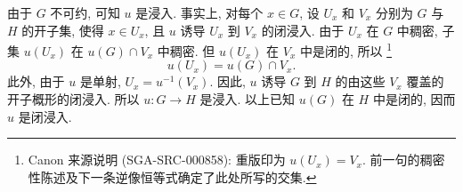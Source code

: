 由于 \(G\) 不可约, 可知 \(u\) 是浸入.
事实上, 对每个 \(x\in G\),
设 \(U_x\) 和 \(V_x\) 分别为 \(G\) 与 \(H\) 的开子集,
使得 \(x\in U_x\), 且 \(u\) 诱导 \(U_x\) 到 \(V_x\) 的闭浸入.
由于 \(U_x\) 在 \(G\) 中稠密,
子集 \(u(U_x)\) 在 \(u(G)\cap V_x\) 中稠密.
但 \(u(U_x)\) 在 \(V_x\) 中是闭的, 所以
\footnote{Canon 来源说明 (SGA-SRC-000858): 重版印为 \(u(U_x)=V_x\).
前一句的稠密性陈述及下一条逆像恒等式确定了此处所写的交集.}
\[
  u(U_x)=u(G)\cap V_x.
\]
此外, 由于 \(u\) 是单射, \(U_x=u^{-1}(V_x)\).
因此, \(u\) 诱导 \(G\) 到 \(H\) 的由这些 \(V_x\) 覆盖的开子概形的闭浸入.
所以 \(u:G\to H\) 是浸入.
以上已知 \(u(G)\) 在 \(H\) 中是闭的, 因而 \(u\) 是闭浸入.

